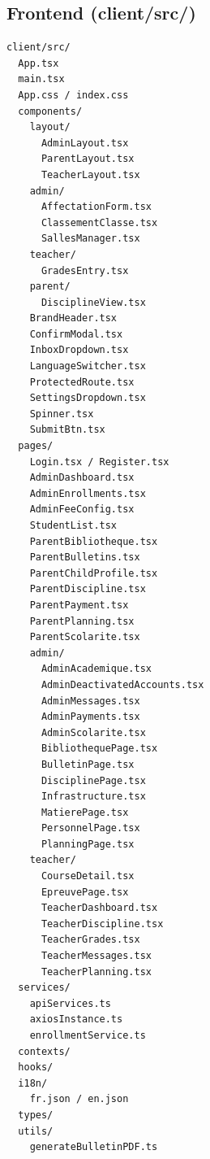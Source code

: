 \documentclass[12pt,a4paper]{report}
\begin{document}
\subsection*{Frontend (client/src/)}
\begin{lstlisting}
client/src/
  App.tsx
  main.tsx
  App.css / index.css
  components/
    layout/
      AdminLayout.tsx
      ParentLayout.tsx
      TeacherLayout.tsx
    admin/
      AffectationForm.tsx
      ClassementClasse.tsx
      SallesManager.tsx
    teacher/
      GradesEntry.tsx
    parent/
      DisciplineView.tsx
    BrandHeader.tsx
    ConfirmModal.tsx
    InboxDropdown.tsx
    LanguageSwitcher.tsx
    ProtectedRoute.tsx
    SettingsDropdown.tsx
    Spinner.tsx
    SubmitBtn.tsx
  pages/
    Login.tsx / Register.tsx
    AdminDashboard.tsx
    AdminEnrollments.tsx
    AdminFeeConfig.tsx
    StudentList.tsx
    ParentBibliotheque.tsx
    ParentBulletins.tsx
    ParentChildProfile.tsx
    ParentDiscipline.tsx
    ParentPayment.tsx
    ParentPlanning.tsx
    ParentScolarite.tsx
    admin/
      AdminAcademique.tsx
      AdminDeactivatedAccounts.tsx
      AdminMessages.tsx
      AdminPayments.tsx
      AdminScolarite.tsx
      BibliothequePage.tsx
      BulletinPage.tsx
      DisciplinePage.tsx
      Infrastructure.tsx
      MatierePage.tsx
      PersonnelPage.tsx
      PlanningPage.tsx
    teacher/
      CourseDetail.tsx
      EpreuvePage.tsx
      TeacherDashboard.tsx
      TeacherDiscipline.tsx
      TeacherGrades.tsx
      TeacherMessages.tsx
      TeacherPlanning.tsx
  services/
    apiServices.ts
    axiosInstance.ts
    enrollmentService.ts
  contexts/
  hooks/
  i18n/
    fr.json / en.json
  types/
  utils/
    generateBulletinPDF.ts
\end{lstlisting}
 
\end{document}
